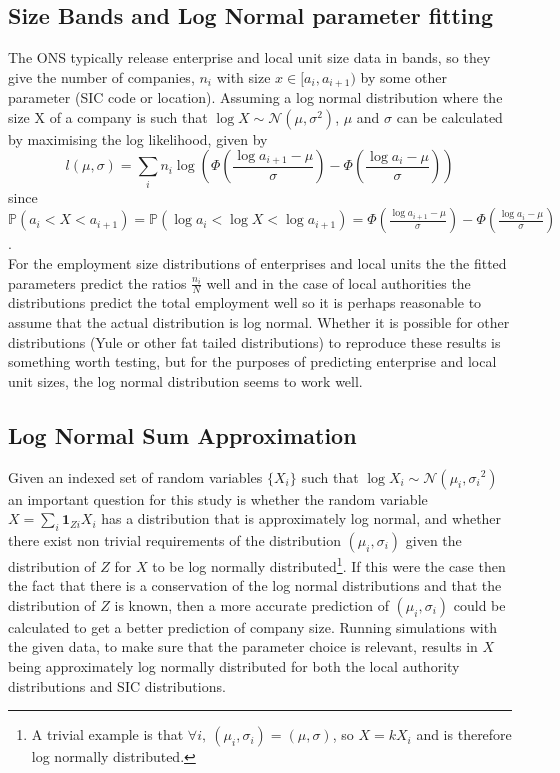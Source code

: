 \documentclass[a4paper,10pt]{article}
\begin{document}
\subsection{Size Bands and Log Normal parameter fitting}
\label{ONS size dist parameter fitting}
The ONS typically release enterprise and local unit size data in bands, so they give the number of companies, $n_i$ with size $x \in [a_i, a_{i+1})$ by some other parameter (SIC code or location). Assuming a log normal distribution where the size X of a company is such that $\log X \sim \mathcal{N}(\mu, \sigma^2)$, $\mu$ and $\sigma$ can be calculated by maximising the log likelihood, given by
\begin{equation}
 l(\mu, \sigma) = \sum_i n_i \log \left( \Phi \left( \frac{\log a_{i + 1} - \mu}{\sigma} \right) - \Phi \left( \frac{\log a_{i} - \mu}{\sigma} \right) \right)
\end{equation}
since $\mathbb{P}(a_i < X < a_{i + 1}) = \mathbb{P}(\log a_i < \log X < \log a_{i + 1}) = \Phi \left( \frac{\log a_{i + 1} - \mu}{\sigma} \right) - \Phi \left( \frac{\log a_{i} - \mu}{\sigma} \right)$. \\
For the employment size distributions of enterprises and local units the the fitted parameters predict the ratios $\frac{n_i}{N}$ well and in the case of local authorities the distributions predict the total employment well so it is perhaps reasonable to assume that the actual distribution is log normal. Whether it is possible for other distributions (Yule or other fat tailed distributions) to reproduce these results is something worth testing, but for the purposes of predicting enterprise and local unit sizes, the log normal distribution seems to work well.

\subsection{Log Normal Sum Approximation}
\label{Log Normal Sum Approximation}
Given an indexed set of random variables $\{X_i\}$ such that $\log X_i \sim \mathcal{N}(\mu_i, {\sigma_i}^2)$ an important question for this study is whether the random variable $X = \sum_i\mathbf{1}_{Zi}X_i$ has a distribution that is approximately log normal, and whether there exist non trivial requirements of the distribution ${(\mu_i, \sigma_i)}$ given the distribution of $Z$ for $X$ to be log normally distributed\footnote{A trivial example is that $\forall i, \ (\mu_i, \sigma_i) = (\mu, \sigma)$, so $X = kX_i$ and is therefore log normally distributed.}. If this were the case then the fact that there is a conservation of the log normal distributions and that the distribution of $Z$ is known, then a more accurate prediction of ${(\mu_i, \sigma_i)}$ could be calculated to get a better prediction of company size.
Running simulations with the given data, to make sure that the parameter choice is relevant, results in $X$ being approximately log normally distributed for both the local authority distributions and SIC distributions. %
\end{document}
